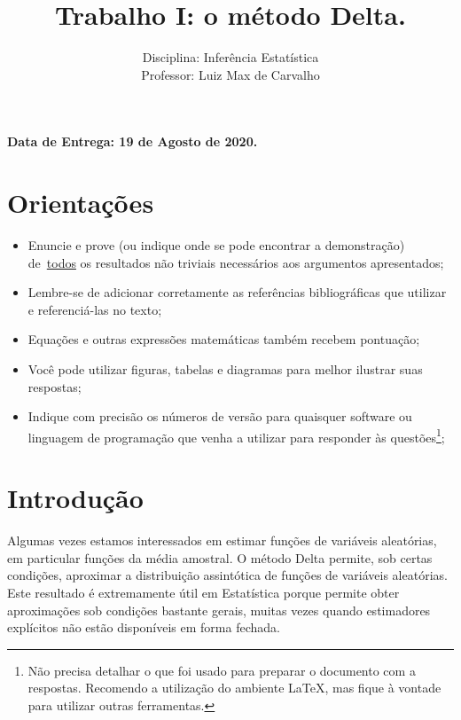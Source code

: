 \documentclass[a4paper,10pt, notitlepage]{report}
\title{Trabalho I: o método Delta.}
\author{Disciplina: Inferência Estatística \\ Professor: Luiz Max de Carvalho}
\begin{document}
\maketitle

\textbf{Data de Entrega: 19 de Agosto de 2020.}

\section*{Orientações}
\begin{itemize}
 \item Enuncie e prove (ou indique onde se pode encontrar a demonstração) de~\underline{todos} os resultados não triviais necessários aos argumentos apresentados;
 \item Lembre-se de adicionar corretamente as referências bibliográficas que utilizar e referenciá-las no texto;
 \item Equações e outras expressões matemáticas também recebem pontuação;
 \item Você pode utilizar figuras, tabelas e diagramas para melhor ilustrar suas respostas;
 \item Indique com precisão os números de versão para quaisquer software ou linguagem de programação que venha a utilizar para responder às questões\footnote{Não precisa detalhar o que foi usado para preparar o documento com a respostas. Recomendo a utilização do ambiente LaTeX, mas fique à vontade para utilizar outras ferramentas.};
 \end{itemize}


\section*{Introdução}

Algumas vezes estamos interessados em estimar funções de variáveis aleatórias, em particular funções da média amostral.
O método Delta permite, sob certas condições, aproximar a distribuição assintótica de funções de variáveis aleatórias.
Este resultado é extremamente útil em Estatística porque permite obter aproximações sob condições bastante gerais, muitas vezes quando estimadores explícitos não estão disponíveis em forma fechada.
\end{document}
